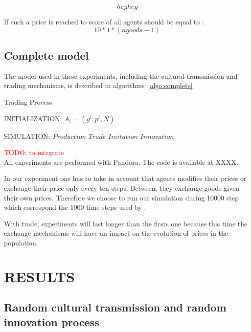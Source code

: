 \documentclass{wscpaperproc}
\newcommand{\memo}[2]{\textcolor{#1}{#2}}
\newcommand{\todo}[1]{\memo{red}{TODO: #1\\}}
\begin{document}
$$ hey hey $$

If such a price is reached to score of all agents should be equal to : $$ 10*1*(ngoods-1) $$


\subsection{Complete model}

The model used in these experiments, including the cultural transmission and trading mechanisms, is described in algorithms~\ref{algo:complete}

\begin{algorithm}
\caption{Trading Process}
\label{algo:complete}
	\begin{algorithmic}[1]
	\scriptsize
	\State INITIALIZATION: 
				\State $A_i = (g^i,p^i, N)$ 
			\EndFor
		\EndFor

	\State SIMULATION:
				\State $Production$
				\State $Trade$				
					\State $Imitation$
					\State $Innovation$
				\EndIf
			\EndFor
		\EndLoop
\end{algorithmic}
\end{algorithm}

\todo{to integrate}
All experiments are performed with Pandora. The code is available at XXXX.

In our experiment one has to take in account that agents modifies their prices or exchange their price only every ten steps. Between, they exchange goods given their own prices. Therefore we choose to run our simulation during 10000 step which correspond the 1000 time steps used by \cite{bentley_random_2004,mesoudi_random_2009}.

With trade, experiments will last longer than the firsts one because this time the exchange mechanisms will have an impact on the evolution of prices in the population. 


\section{RESULTS}
\subsection{Random cultural transmission and random innovation process}
\end{document}
